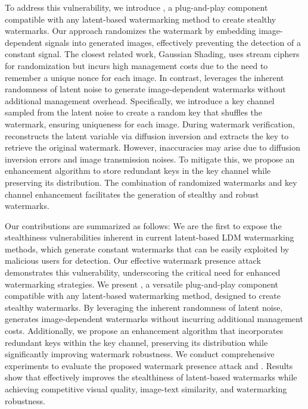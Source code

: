 To address this vulnerability, we introduce \tool, a plug-and-play component compatible with any latent-based watermarking method to create stealthy watermarks. Our approach randomizes the watermark by embedding image-dependent signals into generated images, effectively preventing the detection of a constant signal. The closest related work, Gaussian Shading, uses stream ciphers for randomization but incurs high management costs due to the need to remember a unique nonce for each image. In contrast, \tool leverages the inherent randomness of latent noise to generate image-dependent watermarks without additional management overhead. Specifically, we introduce a key channel sampled from the latent noise to create a random key that shuffles the watermark, ensuring uniqueness for each image. During watermark verification, \tool reconstructs the latent variable via diffusion inversion and extracts the key to retrieve the original watermark. However, inaccuracies may arise due to diffusion inversion errors and image transmission noises. To mitigate this, we propose an enhancement algorithm to store redundant keys in the key channel while preserving its distribution. The combination of randomized watermarks and key channel enhancement facilitates the generation of stealthy and robust watermarks.


Our contributions are summarized as follows:
 We are the first to expose the stealthiness vulnerabilities inherent in current latent-based LDM watermarking methods, which generate constant watermarks that can be easily exploited by malicious users for detection. Our effective watermark presence attack demonstrates this vulnerability, underscoring the critical need for enhanced watermarking strategies.
 We present \tool, a versatile plug-and-play component compatible with any latent-based watermarking method, designed to create stealthy watermarks. By leveraging the inherent randomness of latent noise, \tool generates image-dependent watermarks without incurring additional management costs. Additionally, we propose an enhancement algorithm that incorporates redundant keys within the key channel, preserving its distribution while significantly improving watermark robustness.
 We conduct comprehensive experiments to evaluate the proposed watermark presence attack and \tool. Results show that \tool effectively improves the stealthiness of latent-based watermarks while achieving competitive visual quality, image-text similarity, and watermarking robustness.




